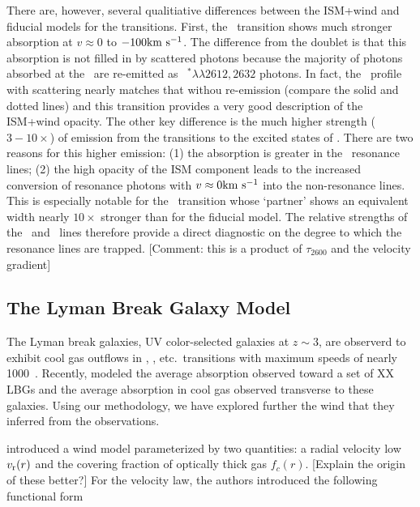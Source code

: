 \documentclass[12pt,preprint]{aastex}
\begin{document}
There are, however, several qualitiative differences between the
ISM+wind and fiducial models for the  transitions.  First,
the \feiia\ transition shows much stronger absorption at $v \approx 0$
to $-100 {\rm km~s^{-1}}$.  The difference from the  doublet is that
this absorption is not filled in by scattered photons because the
majority of photons absorbed at the \feiia\ are re-emitted as
~$^* \lambda\lambda 2612, 2632$ photons.  In fact, the
\feiia\ profile with scattering nearly matches that withou re-emission
(compare the solid and dotted lines) and this transition provides a
very good description of the ISM+wind opacity.  The other key
difference is the much higher strength ($3-10\times$) of emission from the
transitions to the excited states of \aconfig.   There are two reasons
for this higher emission: (1) the absorption is greater in the \feiid\
resonance lines; (2) the high opacity of the ISM component leads to
the increased conversion of resonance photons with $v \approx 0{\rm km~s^{-1}}$
into the non-resonance lines.  This is especially notable for the
\feiib\ transition whose `partner' shows an equivalent width nearly
$10\times$ stronger than for the fiducial model.  The relative
strengths of the \feiib\ and \feiie\ lines therefore provide a direct
diagnostic on the degree to which the resonance lines are trapped.
[Comment:  this is a product of $\tau_{2600}$ and the velocity
gradient]

\subsection{The Lyman Break Galaxy Model}
\label{sec:lbg}

The Lyman break galaxies, UV color-selected galaxies at $z \sim 3$,
are observerd to exhibit cool gas outflows in \ion{Si}{2}, ,
etc.\ transitions with maximum speeds of nearly 1000\kms\
\citep[e.g.][]{lowenthal,pettini,steidel+10}.
Recently, \cite{steidel+10} modeled the average absorption observed
toward a set of XX LBGs and the average absorption in cool gas
observed transverse to these galaxies.  Using our methodology, we have
explored further the wind that they inferred from the observations.

\cite{steidel+10} introduced a wind model parameterized by two
quantities: a radial velocity low $v_{\rm r}(r)$ and the covering fraction of
optically thick gas $f_c(r)$.  [Explain the origin of these better?]
For the velocity law, the authors introduced the following functional
form
\end{document}
